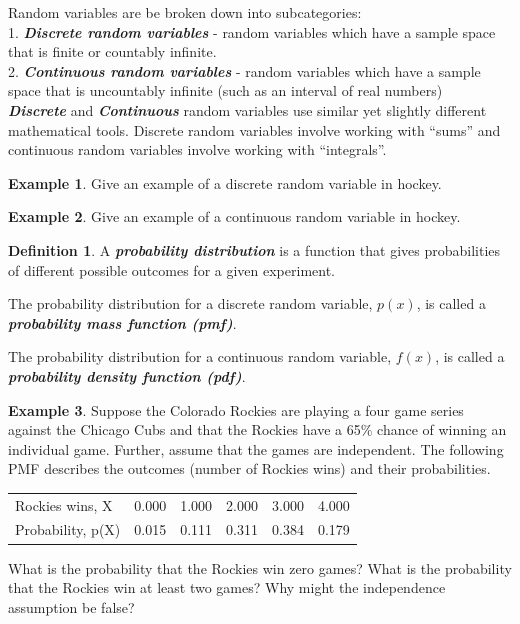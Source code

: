 \documentclass[
  11pt,
]{book}
\theoremstyle{definition}
\newtheorem{definition}{Definition}[chapter]
\theoremstyle{definition}
\newtheorem{example}{Example}[chapter]
\theoremstyle{definition}
\theoremstyle{definition}
\theoremstyle{remark}
\begin{document}
Random variables are be broken down into subcategories:\\
1. \textbf{\emph{Discrete random variables}} - random variables which have a sample space that is finite or countably infinite.\\
2. \textbf{\emph{Continuous random variables}} - random variables which have a sample space that is uncountably infinite (such as an interval of real numbers)\\

\textbf{\emph{Discrete}} and \textbf{\emph{Continuous}} random variables use similar yet slightly different mathematical tools. Discrete random variables involve working with ``sums'' and continuous random variables involve working with ``integrals''.\\

\begin{example}
Give an example of a discrete random variable in hockey.
\end{example}

\hfill\break
\hfill\break
\hfill\break
\vfill

\begin{example}
Give an example of a continuous random variable in hockey.
\end{example}

\hfill\break
\hfill\break
\hfill\break
\vfill

\begin{definition}
A \textbf{\emph{probability distribution}} is a function that gives probabilities of different possible outcomes for a given experiment.
\end{definition}

The probability distribution for a discrete random variable, \(p(x)\), is called a \textbf{\emph{probability mass function (pmf)}}.

The probability distribution for a continuous random variable, \(f(x)\), is called a \textbf{\emph{probability density function (pdf)}}.

\newpage

\begin{example}
Suppose the Colorado Rockies are playing a four game series against the Chicago Cubs and that the Rockies have a 65\% chance of winning an individual game. Further, assume that the games are independent. The following PMF describes the outcomes (number of Rockies wins) and their probabilities.

\begin{table}[H]
\centering
\begin{tabular}{lrrrrr}
\toprule
Rockies wins, X & 0.000 & 1.000 & 2.000 & 3.000 & 4.000\\
Probability, p(X) & 0.015 & 0.111 & 0.311 & 0.384 & 0.179\\
\bottomrule
\end{tabular}
\end{table}

\vfill

What is the probability that the Rockies win zero games? What is the probability that the Rockies win at least two games? Why might the independence assumption be false?
\end{example}
\end{document}
